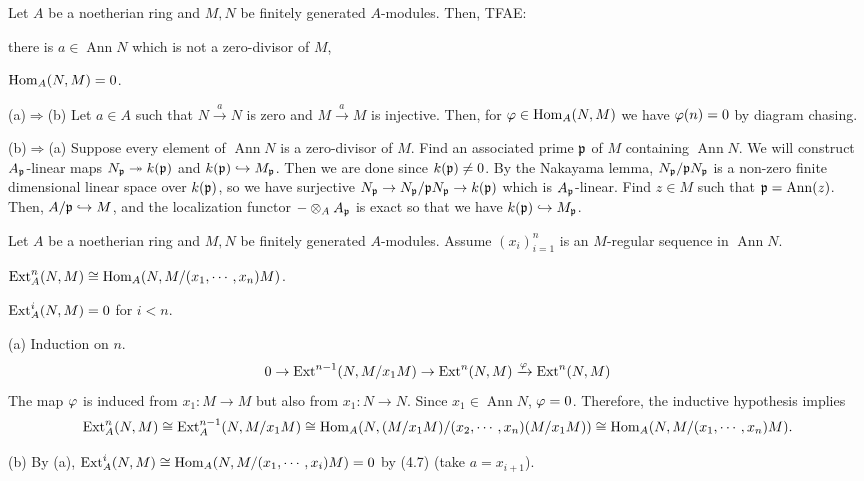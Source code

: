 \documentclass{../../../small}
\newcommand{\Ann}{\operatorname{Ann}}
\begin{document}
\begin{lem*}[4.7]
Let $A$ be a noetherian ring and $M,N$ be finitely generated $A$-modules.
Then, TFAE:
\begin{parts}
\item there is $a\in\Ann N$ which is not a zero-divisor of $M$,
\item $\operatorname{Hom}_A(N,M)=0$.
\end{parts}
\end{lem*}
\begin{pf}
(a)$\Rightarrow$(b)
Let $a\in A$ such that $N\xrightarrow{a}N$ is zero and $M\xrightarrow{a}M$ is injective.
Then, for $\varphi\in\operatorname{Hom}_A(N,M)$ we have $\varphi(n)=0$ by diagram chasing.

(b)$\Rightarrow$(a)
Suppose every element of $\Ann N$ is a zero-divisor of $M$.
Find an associated prime $\mathfrak{p}$ of $M$ containing $\Ann N$.
We will construct $A_{\mathfrak{p}}$-linear maps $N_{\mathfrak{p}}\twoheadrightarrow k(\mathfrak{p})$ and $k(\mathfrak{p})\hookrightarrow M_{\mathfrak{p}}$.
Then we are done since $k(\mathfrak{p})\ne0$.
By the Nakayama lemma, $N_{\mathfrak{p}}/\mathfrak{p} N_{\mathfrak{p}}$ is a non-zero finite dimensional linear space over $k(\mathfrak{p})$, so we have surjective $N_{\mathfrak{p}}\to N_{\mathfrak{p}}/\mathfrak{p} N_{\mathfrak{p}}\to k(\mathfrak{p})$ which is $A_{\mathfrak{p}}$-linear.
Find $z\in M$ such that $\fp=\Ann(z)$.
Then, $A/\mathfrak{p}\hookrightarrow M$, and the localization functor $-\otimes_AA_{\mathfrak{p}}$ is exact so that we have $k(\mathfrak{p})\hookrightarrow M_{\mathfrak{p}}$.
\end{pf}

\begin{prop*}[4.8]
Let $A$ be a noetherian ring and $M,N$ be finitely generated $A$-modules.
Assume $(x_i)_{i=1}^n$ is an $M$-regular sequence in $\Ann N$.
\begin{parts}
\item $\operatorname{Ext}_A^n(N,M)\cong\operatorname{Hom}_A(N,M/(x_1,\cdots,x_n)M)$.
\item $\operatorname{Ext}_A^i(N,M)=0$ for $i<n$.
\end{parts}
\end{prop*}
\begin{pf}
(a)
Induction on $n$.
\[0\to\operatorname{Ext}^{n-1}(N,M/x_1M)\to\operatorname{Ext}^n(N,M)\xrightarrow{\varphi}\operatorname{Ext}^n(N,M)\]
The map $\varphi$ is induced from $x_1:M\to M$ but also from $x_1:N\to N$.
Since $x_1\in\Ann N$, $\varphi=0$.
Therefore, the inductive hypothesis implies
\[\operatorname{Ext}_A^n(N,M)\cong\operatorname{Ext}_A^{n-1}(N,M/x_1M)\cong\operatorname{Hom}_A(N,(M/x_1M)/(x_2,\cdots,x_n)(M/x_1M))\cong\operatorname{Hom}_A(N,M/(x_1,\cdots,x_n)M).\]

(b)
By (a), $\operatorname{Ext}_A^i(N,M)\cong\operatorname{Hom}_A(N,M/(x_1,\cdots,x_i)M)=0$ by (4.7) (take $a=x_{i+1}$).

\end{pf}
\end{document}
